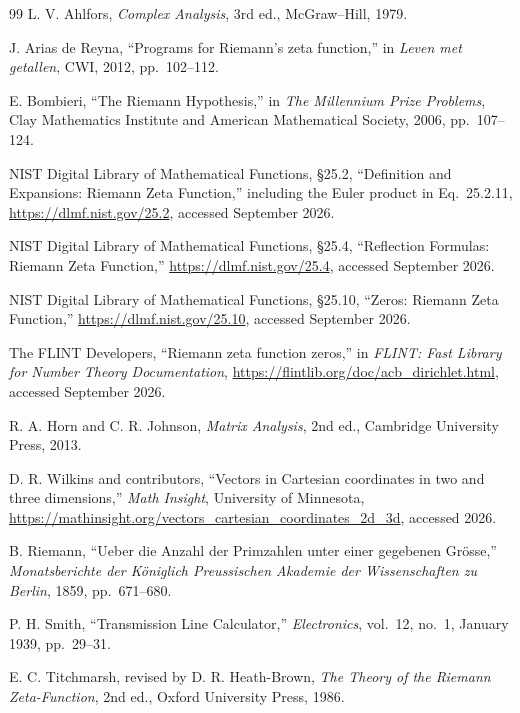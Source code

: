 \documentclass[11pt]{article}
\begin{document}
\begin{thebibliography}{99}
\small
{}
L. V. Ahlfors, \emph{Complex Analysis}, 3rd ed., McGraw--Hill, 1979.

J. Arias de Reyna, ``Programs for Riemann's zeta function,'' in
\emph{Leven met getallen}, CWI, 2012, pp.~102--112.

E. Bombieri, ``The Riemann Hypothesis,'' in \emph{The Millennium Prize Problems},
Clay Mathematics Institute and American Mathematical Society, 2006, pp.~107--124.

NIST Digital Library of Mathematical Functions, \S25.2, ``Definition and Expansions:
Riemann Zeta Function,'' including the Euler product in Eq.~25.2.11,
\url{https://dlmf.nist.gov/25.2}, accessed September 2026.

NIST Digital Library of Mathematical Functions, \S25.4, ``Reflection Formulas:
Riemann Zeta Function,'' \url{https://dlmf.nist.gov/25.4}, accessed September 2026.

NIST Digital Library of Mathematical Functions, \S25.10, ``Zeros: Riemann Zeta Function,''
\url{https://dlmf.nist.gov/25.10}, accessed September 2026.

The FLINT Developers, ``Riemann zeta function zeros,'' in
\emph{FLINT: Fast Library for Number Theory Documentation},
\url{https://flintlib.org/doc/acb_dirichlet.html}, accessed September 2026.

R. A. Horn and C. R. Johnson, \emph{Matrix Analysis}, 2nd ed.,
Cambridge University Press, 2013.

D. R. Wilkins and contributors, ``Vectors in Cartesian coordinates in two and three
dimensions,'' \emph{Math Insight}, University of Minnesota,
\url{https://mathinsight.org/vectors_cartesian_coordinates_2d_3d}, accessed 2026.

B. Riemann, ``Ueber die Anzahl der Primzahlen unter einer gegebenen Gr\"osse,''
\emph{Monatsberichte der K\"oniglich Preussischen Akademie der Wissenschaften zu Berlin},
1859, pp.~671--680.

P. H. Smith, ``Transmission Line Calculator,'' \emph{Electronics}, vol.~12, no.~1,
January 1939, pp.~29--31.

E. C. Titchmarsh, revised by D. R. Heath-Brown,
\emph{The Theory of the Riemann Zeta-Function}, 2nd ed., Oxford University Press, 1986.
\end{thebibliography}
\end{document}
